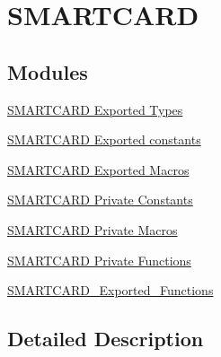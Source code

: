 \hypertarget{group___s_m_a_r_t_c_a_r_d}{}\section{S\+M\+A\+R\+T\+C\+A\+RD}
\label{group___s_m_a_r_t_c_a_r_d}
\subsection*{Modules}
\begin{DoxyCompactItemize}
\item 
\hyperlink{group___s_m_a_r_t_c_a_r_d___exported___types}{S\+M\+A\+R\+T\+C\+A\+R\+D Exported Types}
\item 
\hyperlink{group___s_m_a_r_t_c_a_r_d___exported___constants}{S\+M\+A\+R\+T\+C\+A\+R\+D Exported constants}
\item 
\hyperlink{group___s_m_a_r_t_c_a_r_d___exported___macros}{S\+M\+A\+R\+T\+C\+A\+R\+D Exported Macros}
\item 
\hyperlink{group___s_m_a_r_t_c_a_r_d___private___constants}{S\+M\+A\+R\+T\+C\+A\+R\+D Private Constants}
\item 
\hyperlink{group___s_m_a_r_t_c_a_r_d___private___macros}{S\+M\+A\+R\+T\+C\+A\+R\+D Private Macros}
\item 
\hyperlink{group___s_m_a_r_t_c_a_r_d___private___functions}{S\+M\+A\+R\+T\+C\+A\+R\+D Private Functions}
\item 
\hyperlink{group___s_m_a_r_t_c_a_r_d___exported___functions}{S\+M\+A\+R\+T\+C\+A\+R\+D\+\_\+\+Exported\+\_\+\+Functions}
\end{DoxyCompactItemize}


\subsection{Detailed Description}
